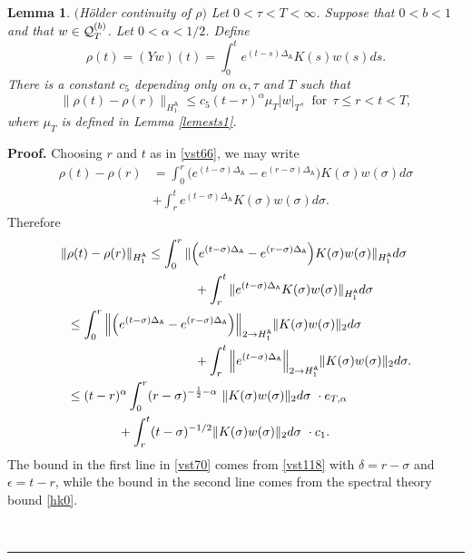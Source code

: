 \documentclass[12pt]{article}
\newtheorem{lemma}[theorem]{Lemma}
\newenvironment{proof}[1][Proof]{\textbf{#1.} }{\ \rule{0.5em}{0.5em}}
\def \As{\mathsf{A}}
\def \Q{{\cal Q}}
\def \beq{\begin{equation}}
\def \eeq{\end{equation}}
\def \eref{\eqref}
\numberwithin{equation}{section}
\begin{document}
\begin{lemma} \label{lemH}$($H\"older continuity of $\rho$$)$  
Let $0 < \tau <T < \infty$. Suppose that  $0 < b <1$ and that $w \in \Q_T^{(b)}$.       
Let $0 < \alpha < 1/2$.  
Define
\beq
\rho(t) =(Yw)(t) = \int_0^t e^{(t-s)\Delta_\As} K(s) w(s) ds.              \label{vst65}
\eeq
There is a constant  $c_5$ depending only on $\alpha, \tau$  and $T$ such that
\beq
\|\rho(t) - \rho(r)\|_{H_1^\As} \le c_5 (t-r)^\alpha  \mu_T  |w|_T, \ \ \text{for}\ \ \tau \le r <t <T,  \label{vst66}
\eeq
where $\mu_T$ is defined in Lemma \ref{lemests1}.
\end{lemma}
   \begin{proof}
 Choosing $r$ and $t$ as in \eref{vst66},  
 we may write 
 \begin{align*}
   \rho(t) - \rho(r) &= \int_0^r \Big( e^{(t-\sigma)\Delta_\As} - e^{(r-\sigma)\Delta_\As} \Big)
     K(\sigma)w(\sigma)d\sigma  \\
      &   + \int_r^t e^{(t-\sigma)\Delta_\As} K(\sigma)w(\sigma)d\sigma.
   \end{align*}
 Therefore 
   \begin{align}
  \| &\rho(t) - \rho(r)\|_{H_1^\As}                                                                 
 \le \int_0^r \| \Big( e^{(t-\sigma)\Delta_\As} - e^{(r-\sigma)\Delta_\As}\Big) 
                                       K(\sigma)w(\sigma)\|_{H_1^\As}d\sigma   \notag \\
                &\ \ \ \ \ \ \qquad  \qquad  \qquad \qquad 
      + \int_r^t\| e^{(t-\sigma)\Delta_\As} K(\sigma)w(\sigma)\|_{H_1^\As}d\sigma                      \notag\\
& \le  \int_0^r \Big\| \Big( e^{(t-\sigma)\Delta_\As} - e^{(r-\sigma)\Delta_\As}\Big)\Big\|_{2\rightarrow H_1^\As}
                     \|K(\sigma) w(\sigma)\|_{2}  d\sigma                   \notag\\
&\ \ \ \ \ \ \qquad  \qquad  \qquad \qquad  
    +  \int_r^t \Big\|e^{(t-\sigma)\Delta_\As}\Big\|_{2\rightarrow H_1^\As}
                                                             \|K(\sigma) w(\sigma)\|_{2} d\sigma.   \notag\\
&\le  (t-r)^\alpha \int_0^r  (r-\sigma)^{-\frac{1}{2} - \alpha}\  
                                           \|K(\sigma) w(\sigma)\|_{2} d\sigma\   \cdot e_{T, \alpha} \notag\\
&\qquad\qquad  +    \int_r^t (t-\sigma)^{-1/2}   
                               \|K(\sigma) w(\sigma)\|_{2} d\sigma  \   \cdot   c_1 .                   \label{vst70}
  \end{align}
  The bound in the first line in \eref{vst70} comes from \eref{vst118} with 
  $\delta = r-\sigma$ and $\epsilon = t-r$, while the bound
   in the second line      comes from      the spectral theory bound 
   \eref{hk0}.      


\end{proof}
\end{document}

